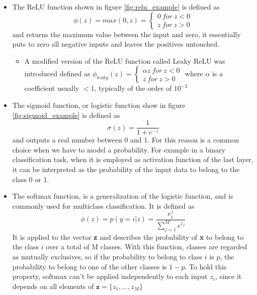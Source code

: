 \documentclass[11pt]{report}
\begin{document}
\begin{itemize}

\item The ReLU function shown in figure \ref{fig:relu_example} is defined as
\begin{equation}\label{eq:relu}
\phi(z) = max(0, z) = \begin{cases} 0 \ for \ z<0 \\ z \ for \ z>0 \end{cases}
\end{equation}
and returns the maximum value between the input and zero, it essentially puts to zero all negative inputs and leaves the positives untouched.
\begin{itemize}
\item A modified version of the ReLU function called Leaky ReLU was introduced defined as
$\phi_{leaky}(z) = \begin{cases} \alpha z \ for \ z<0 \\ z \ for \ z>0 \end{cases}$ where $\alpha$ is a coefficient usually $< 1$, typically of the order of $10^{-2}$
\end{itemize}

\item The sigmoid function, or logistic function show in figure \ref{fig:sigmoid_example} is defined as
\begin{equation}\label{eq:sigmoid}
\sigma (z) = \frac{1}{1+e^{-z}}
\end{equation}
and outputs a real number between 0 and 1.
For this reason is a common choice when we have to model a probability.
For example in a binary classification task, when it is employed as activation function of the last layer, it can be interpreted as the probability of the input data to belong to the class 0 or 1.


\item The softmax function, is a generalization of the logistic function, and is commonly used for multiclass classification. It is defined as
\begin{equation}
\phi(z) = p(y = i|z) = \frac{e^z_i}{\sum_{j = 1}^M e^{z_j}}
\end{equation}
It is applied to the vector \textbf{z} and describes the probability of \textbf{x} to belong to the class $i$ over a total of M classes.
With this function, classes are regarded as mutually exclusives, so if the probability to belong to class $i$ is $p$, the probability to belong to one of the other classes is $1-p$.
To hold this property, softmax can't be applied independently to each input $z_i$, since it depends on all elements of $\textbf{z} = \{z_1, ..., z_M\}$
\end{itemize}
\end{document}
